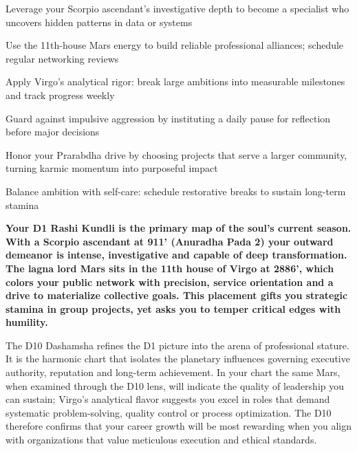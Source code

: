 \begin{diamondlist}
  \item {\fontsize{8.5}{12}\selectfont Leverage your Scorpio ascendant's investigative depth to become a specialist who uncovers hidden patterns in data or systems}
  \item {\fontsize{8.5}{12}\selectfont Use the 11th-house Mars energy to build reliable professional alliances; schedule regular networking reviews}
  \item {\fontsize{8.5}{12}\selectfont Apply Virgo's analytical rigor: break large ambitions into measurable milestones and track progress weekly}
  \item {\fontsize{8.5}{12}\selectfont Guard against impulsive aggression by instituting a daily pause for reflection before major decisions}
  \item {\fontsize{8.5}{12}\selectfont Honor your Prarabdha drive by choosing projects that serve a larger community, turning karmic momentum into purposeful impact}
  \item {\fontsize{8.5}{12}\selectfont Balance ambition with self-care: schedule restorative breaks to sustain long-term stamina}
\end{diamondlist}


\label{topic6}

{\fontsize{9.5}{13.8}\selectfont\bfseries\color{DeepSlate} Your D1 Rashi Kundli is the primary map of the soul's current season. With a Scorpio ascendant at 9\textdegree{}11' (Anuradha Pada 2) your outward demeanor is intense, investigative and capable of deep transformation. The lagna lord Mars sits in the 11th house of Virgo at 28\textdegree{}86', which colors your public network with precision, service orientation and a drive to materialize collective goals. This placement gifts you strategic stamina in group projects, yet asks you to temper critical edges with humility.}\par\vspace{2mm}

{\fontsize{9}{13}\selectfont The D10 Dashamsha refines the D1 picture into the arena of professional stature. It is the harmonic chart that isolates the planetary influences governing executive authority, reputation and long-term achievement. In your chart the same Mars, when examined through the D10 lens, will indicate the quality of leadership you can sustain; Virgo's analytical flavor suggests you excel in roles that demand systematic problem-solving, quality control or process optimization. The D10 therefore confirms that your career growth will be most rewarding when you align with organizations that value meticulous execution and ethical standards.}\par\vspace{1.8mm}

